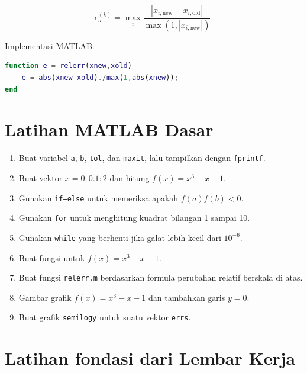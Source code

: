 \begin{equation}
e_a^{(k)}
=
\max_i
\frac{|x_{i,\mathrm{new}}-x_{i,\mathrm{old}}|}
{\max\left(1,|x_{i,\mathrm{new}}|\right)}.
\end{equation}

Implementasi MATLAB:

\begin{lstlisting}[language=Matlab]
function e = relerr(xnew,xold)
    e = abs(xnew-xold)./max(1,abs(xnew));
end
\end{lstlisting}

\section{Latihan MATLAB Dasar}

\begin{enumerate}
\item Buat variabel \texttt{a}, \texttt{b}, \texttt{tol}, dan \texttt{maxit}, lalu tampilkan dengan \texttt{fprintf}.
\item Buat vektor $x=0:0.1:2$ dan hitung $f(x)=x^3-x-1$.
\item Gunakan \texttt{if--else} untuk memeriksa apakah $f(a)f(b)<0$.
\item Gunakan \texttt{for} untuk menghitung kuadrat bilangan 1 sampai 10.
\item Gunakan \texttt{while} yang berhenti jika galat lebih kecil dari $10^{-6}$.
\item Buat fungsi untuk $f(x)=x^3-x-1$.
\item Buat fungsi \texttt{relerr.m} berdasarkan formula perubahan relatif berskala di atas.
\item Gambar grafik $f(x)=x^3-x-1$ dan tambahkan garis $y=0$.
\item Buat grafik \texttt{semilogy} untuk suatu vektor \texttt{errs}.
\end{enumerate}

\section{Latihan fondasi dari Lembar Kerja}

